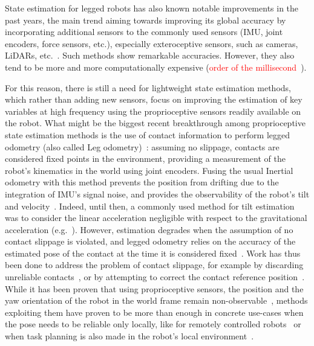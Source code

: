 \documentclass{IJCAS}
\begin{document}
State estimation for legged robots has also known notable improvements in the past years, the main trend aiming towards improving its global accuracy by incorporating additional sensors to the commonly used sensors (IMU, joint encoders, force sensors, etc.), especially exteroceptive sensors, such as cameras, LiDARs, etc.~\cite{wisth2022vilens, fallon2018AccRobLocWalkRobotsImuVisLidar, Kuang2024TightlyCoupledLidarImuUwb}. Such methods show remarkable accuracies. However, they also tend to be more and more computationally expensive (\textcolor{red}{order of the millisecond~\cite{Kuang2024TightlyCoupledLidarImuUwb}}).

For this reason, there is still a need for lightweight state estimation methods, which rather than adding new sensors, focus on improving the estimation of key variables at high frequency using the proprioceptive sensors readily available on the robot. 
What might be the biggest \textquotedbl recent\textquotedbl{} breakthrough among proprioceptive state estimation methods is the use of contact information to perform legged odometry (also called \textquotedbl Leg\textquotedbl{} odometry)~\cite{Lin2005ALegConfigurationMeasSystemHexapod}: assuming no slippage, contacts are considered fixed points in the environment, providing a measurement of the robot's kinematics in the world using joint encoders. Fusing the usual Inertial odometry with this method prevents the position from drifting due to the integration of IMU's signal noise, and provides the observability of the robot's tilt and velocity~\cite{bloesch2013FusionLegKineAndImu, Wawrzynski2015RobustEstVelocityTilt, masuya2015DeadReckoningAnchoringPivot, benallegue2020LyapunovStableOrientationEstimatorHumanoids}. Indeed, until then, a commonly used method for tilt estimation was to consider the linear acceleration negligible with respect to the gravitational acceleration (e.g.~\cite{mahony2008NonlinearComplementaryFiltersOnSO3}). However, estimation degrades when the assumption of no contact slippage is violated, and legged odometry relies on the accuracy of the estimated pose of the contact at the time it is considered fixed~\cite{lin2021legged, maravgakis2023probabilistic}. Work has thus been done to address the problem of contact slippage, for example by discarding unreliable contacts~\cite{lin2021legged, maravgakis2023probabilistic,yoon2023InvariantSmootherDynamicContactEventInformation}, or by attempting to correct the contact reference position~\cite{bloesch2013FusionLegKineAndImu,Hartley2020RIEKF, Demont2024KineticsObserver}. 
While it has been proven that using proprioceptive sensors, the position and the yaw orientation of the robot in the world frame remain non-observable~\cite{bloesch2013FusionLegKineAndImu}, methods exploiting them have proven to be more than enough in concrete use-cases when the pose needs to be reliable only locally, like for remotely controlled robots~\cite{Grandia2024DesignControlBipedalRoboticCharacter} or when task planning is also made in the robot's local environment~\cite{Tsuru2023OnlineMulticontactReplanningHumanoid}.
\end{document}
